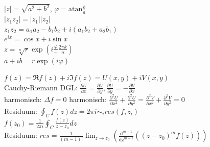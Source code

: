 \documentclass[12pt,a4paper, twoside]{article}
\newcommand{\abs}[1]{\left| #1 \right|}
\newcommand{\pd}[2]{\frac{\partial #1}{\partial #2}}
\newcommand{\pdd}[2]{\frac{\partial^2 #1}{\partial #2^2}}
\renewcommand{\=}[1]{\stackrel{#1}{=}}
\theoremstyle{definition}
\theoremstyle{remark}
\begin{document}
\begin{center}
\begin{minipage}[t]{.39\linewidth}
\vspace{0pt}

$\abs{z} = \sqrt{a^2 + b^2}$, $\varphi = \text{atan} \frac{b}{a}$\\
$\abs{z_1 z_2} = \abs{z_1} \abs{z_2}$\\
$z_1 z_2 = a_1 a_2 - b_1 b_2 + i(a_1 b_2 + a_2 b_1)$\\
$e^{ix} = \cos x + i \sin x$\\
$z = \sqrt[n]{r} \exp(i \frac{\varphi} + \frac{2\pi k}{n})$\\
$a + ib = r \exp(i \varphi)$\\
\end{minipage}%
\begin{minipage}[t]{.59\linewidth}
\vspace{0pt}

$f(z) = \Re f(z) + i \Im f(z) = U(x,y) + i V(x,y)$\\
Cauchy-Riemann DGL: $\pd{U}{x} = \pd{V}{y}, \pd{U}{y} = - \pd{V}{x}$\\
harmonisch: $\Delta f = 0$
harmonisch: $\pdd{U}{x} + \pdd{U}{y} = \pdd{V}{x} + \pdd{V}{y} = 0$\\
Residuum: $\oint_C f(z) dz = 2\pi i \sim_i res(f, z_i)$\\
$f(z_0) = \frac{1}{2\pi i} \oint_C \frac{f(z)}{z-z_0}dz$\\
Residuum: $res = \frac{1}{(m-1)!} \lim_{z \rightarrow z_0} (\frac{\text{d}^{m-1}}{\text{dz}^{m-1}}((z-z_0)^m f(z)))$\\

\end{minipage}
\end{center}
\end{document}
